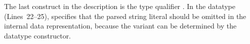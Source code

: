 The last construct in the \darkstar{} description is the type
qualifier .  In the  datatype (Lines~22--25),
 specifies that the parsed string literal should be omitted
in the internal data representation, because the variant can be
determined by the datatype constructor.


